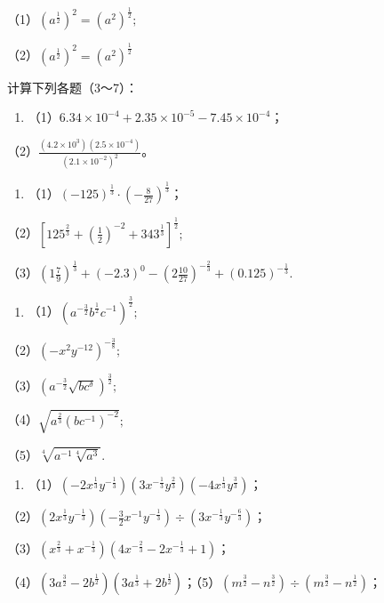 （1）\((a^{\frac{1}{2}})^2 = (a^2)^{\frac{1}{2}};\)

（2）\((a^{\frac{1}{2}})^{2} = (a^{2})^{\frac{1}{2}}\)

计算下列各题（3～7）：

\begin{enumerate}[start=3]
\item
  （1）\(6.34 \times 10^{-4} + 2.35 \times 10^{-5} - 7.45 \times 10^{-4}\)；
\end{enumerate}

（2）\(\frac{(4.2 \times 10^{3})(2.5 \times 10^{-4})}{(2.1 \times 10^{-2})^{2}}\)。

\begin{enumerate}[start=4]
\item
  （1）\((-125)^{\frac{1}{3}} \cdot \left(-\frac{8}{27}\right)^{\frac{1}{3}}\)；
\end{enumerate}

（2）\(\left[125^{\frac{2}{3}} + \left(\frac{1}{2}\right)^{-2} + 343^{\frac{1}{3}}\right]^{\frac{1}{2}};\)

（3）\(\left(1\frac{7}{9}\right)^{\frac{1}{3}} + (-2.3)^{0} - \left(2\frac{10}{27}\right)^{-\frac{2}{3}} + (0.125)^{-\frac{1}{3}}.\)

\begin{enumerate}[start=5]
\item
  （1）\((a^{-\frac{3}{2}}b^{\frac{1}{2}}c^{-1})^{\frac{3}{2}};\)
\end{enumerate}

（2）\((-x^{2}y^{-12})^{-\frac{3}{8}};\)

（3）\((a^{-\frac{3}{2}}\sqrt{b c^{\delta}})^{\frac{3}{2}};\)

（4）\(\sqrt{a^{\frac{2}{3}} (bc^{-1})^{-2}};\)

（5）\(\sqrt[4]{a^{-1}\sqrt[4]{a^3}}.\)

\begin{enumerate}[start=6]
\item
  （1）\((-2x^{\frac{1}{3}}y^{-\frac{1}{3}})(3x^{-\frac{1}{3}}y^{\frac{2}{3}})(-4x^{\frac{1}{3}}y^{\frac{3}{3}})\)；
\end{enumerate}

（2）\((2x^{\frac{1}{3}}y^{-\frac{1}{3}})\left(-\frac{3}{2} x^{-1}y^{-\frac{1}{3}}\right)\div (3x^{-\frac{1}{3}}y^{-\frac{6}{3}})\)；

（3）\((x^{\frac{2}{3}} + x^{-\frac{1}{3}})(4x^{-\frac{2}{3}} - 2x^{-\frac{1}{3}} + 1)\)；

（4）\((3a^{\frac{3}{2}} - 2b^{\frac{1}{2}})(3a^{\frac{1}{3}} + 2b^{\frac{1}{2}})\)；（5）\((m^{\frac{3}{2}} - n^{\frac{3}{2}}) \div (m^{\frac{3}{2}} - n^{\frac{1}{2}})\)；

